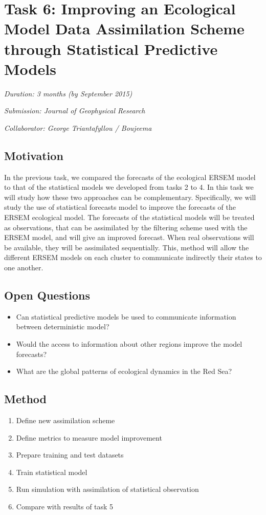 \section{Task 6: Improving an Ecological Model Data Assimilation Scheme through Statistical Predictive Models}

\noindent
\emph{Duration: 3 months (by September 2015)}

\noindent
\emph{Submission: Journal of Geophysical Research}

\noindent
\emph{Collaborator: George Triantafyllou / Boujeema}

\subsection{Motivation}

In the previous task, we compared the forecasts of the ecological ERSEM model to that of the statistical models we developed from tasks 2 to 4. In this task we will study how these two approaches can be complementary. Specifically, we will study the use of statistical forecasts model to improve the forecasts of the ERSEM ecological model. The forecasts of the statistical models will be treated as observations, that can be assimilated by the filtering scheme used with the ERSEM model, and will give an improved forecast. When real observations will be available, they will be assimilated sequentially. This, method will allow the different ERSEM models on each cluster to communicate indirectly their states to one another. 

\subsection{Open Questions}

\begin{itemize}
\item Can statistical predictive models be used to communicate information between deterministic model?
\item Would the access to information about other regions improve the model forecasts?
\item What are the global patterns of ecological dynamics in the Red Sea?
\end{itemize}

\subsection{Method}

\begin{enumerate}
\item Define new assimilation scheme
\item Define metrics to measure model improvement
\item Prepare training and test datasets
\item Train statistical model
\item Run simulation with assimilation of statistical observation
\item Compare with results of task 5
\end{enumerate}

